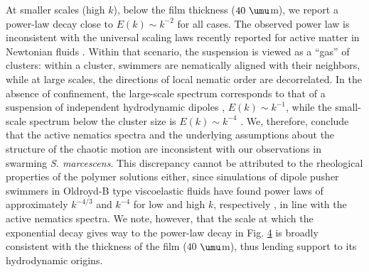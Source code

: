 \documentclass[aps,prl,floatfix,footinbib,twocolumn,superscriptaddress]{revtex4-1}
\begin{document}
At smaller scales (high $k$), below the film thickness ($40~\umu$m), we report a power-law decay close to $E(k) \sim k^{-2}$ for all cases. The observed power law is inconsistent with the universal scaling laws recently reported for active matter in Newtonian fluids \cite{Giomi_PRX_2015,Alert_NP_2020, Carenza_EPL_2020,MartinezPrat_PRX_2021,Alert_Review_2022}. Within that scenario, the suspension is viewed as a ``gas'' of clusters: within a cluster, swimmers are nematically aligned with their neighbors, while at large scales, the directions of local nematic order are decorrelated. In the absence of confinement, the large-scale spectrum corresponds to that of a suspension of independent hydrodynamic dipoles \cite{Giomi_PRX_2015,Alert_NP_2020, Carenza_EPL_2020, MartinezPrat_PRX_2021,Bardfalvy_SM_2019,Morozov_PRX_2020}, $E(k)\sim k^{-1}$, while the small-scale spectrum below the cluster size is $E(k)\sim k^{-4}$ \cite{Giomi_PRX_2015,Alert_NP_2020,MartinezPrat_PRX_2021,Alert_Review_2022}. We, therefore, conclude that the active nematics spectra \cite{Giomi_PRX_2015,Alert_NP_2020,MartinezPrat_PRX_2021} and the underlying assumptions about the structure of the chaotic motion are inconsistent with our observations in swarming \textit{S. marcescens}. This discrepancy cannot be attributed to the rheological properties of the polymer solutions either, since simulations of dipole pusher swimmers in Oldroyd-B type viscoelastic fluids have found power laws of approximately $k^{-4/3}$ and $k^{-4}$ for low and high $k$, respectively \cite{Li_PRL_2016}, in line with the active nematics spectra. We note, however, that the scale at which the exponential decay gives way to the power-law decay in Fig. \hyperref[fig4]{4} is broadly consistent with the thickness of the film ($40$ $\umu$m), thus lending support to its hydrodynamic origins.
\end{document}
